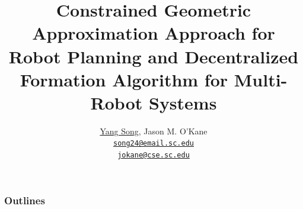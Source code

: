 \title{Constrained Geometric Approximation Approach for Robot Planning and
  Decentralized Formation Algorithm for Multi-Robot Systems}

\author{
  \underline{Yang Song}, Jason M. O'Kane\\
  \href{mailto:song24@email.sc.edu}{{\tt song24@email.sc.edu} \\
  \href{mailto:jokane@cse.sc.edu}{\tt jokane@cse.sc.edu}}
}






\begin{frame}[plain] %
  \titlepage
\end{frame}
\begin{frame}
  \frametitle{Outlines}
  \tableofcontents[]
\end{frame}
